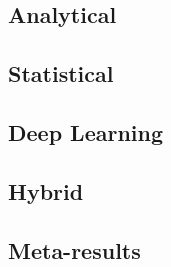 \subsection{Analytical}

\subsection{Statistical}

\subsection{Deep Learning}

\subsection{Hybrid}

\subsection{Meta-results}
